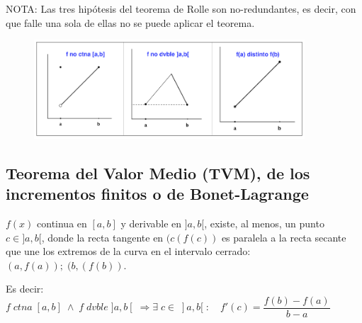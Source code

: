 	
	
	NOTA: Las tres hipótesis del teorema de Rolle son no-redundantes, es decir, con que falle una sola de ellas no se puede aplicar el teorema.
 	\begin{figure}[H]
		\centering
		\includegraphics[width=0.9\textwidth]{imagenes/imagenes05/T05IM26.png}
	\end{figure}
	
	
	\subsection{Teorema del Valor Medio (TVM), de los incrementos finitos o de Bonet-Lagrange}
	
	\begin{teor}   $f(x)$ continua en $[a,b]$ y derivable en $]a,b[$, existe, al menos, un punto  $c\in ]a,b[$, donde la recta tangente en $(c(f(c))$ es paralela a la recta secante que une los extremos de la curva en el intervalo cerrado: $(a,f(a)); \; (b,(f(b))$.
	
	Es decir: $f \; ctna\;  [a,b]\; \wedge \; f \; dvble \;  ]a,b[ \; \Rightarrow \exists \; c\in \; ]a,b[\; : \quad f'(c)=\dfrac {f(b)-f(a)}{b-a}$
		
	\end{teor}
	
